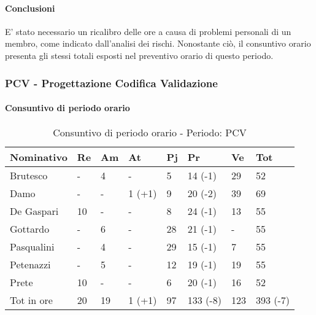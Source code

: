 				\paragraph{Conclusioni}
				E’ stato necessario un ricalibro delle ore a causa di problemi personali di un membro, come indicato
				dall’analisi dei rischi. Nonostante ciò, il consuntivo orario presenta gli stessi totali esposti nel preventivo orario di questo periodo.
\newpage
\subsubsection{PCV - Progettazione Codifica Validazione}
\paragraph{Consuntivo di periodo orario}
							\begin{table}[H] \begin{center} \begin{tabular}{llllllll}
										\toprule
										\textbf{Nominativo}	&	\textbf{Re}	&	\textbf{Am}	&	\textbf{At}	&	\textbf{Pj}	&	\textbf{Pr}	&	\textbf{Ve}	&	\textbf{Tot}\\
										\midrule
										Brutesco	&	-		&	4		&	-		&	5		&	14	(-1)&	29	&	52	\\
										Damo		&	-		&	-		&	1	(+1)&	9		&	20	(-2)&	39	&	69	\\
										De Gaspari	&	10		&	-		&	-		&	8		&	24	(-1)&	13	&	55	\\
										Gottardo	&	-		&	6		&	-		&	28		&	21	(-1)&	-	&	55	\\
										Pasqualini	&	-		&	4		&	-		&	29		&	15	(-1)&	7	&	55	\\
										Petenazzi	&	-		&	5		&	-		&	12		&	19	(-1)&	19	&	55	\\
										Prete		&	10		&	-		&	-		&	6		&	20	(-1)&	16	&	52	\\
										\midrule																				
										Tot in ore	&	20		&	19		&	1	(+1)&	97		&	133	(-8)&	123	&	393	(-7)\\
																				
										\bottomrule
									\end{tabular} \end{center} \caption{Consuntivo di periodo orario - Periodo:
									PCV
								} \end{table}
